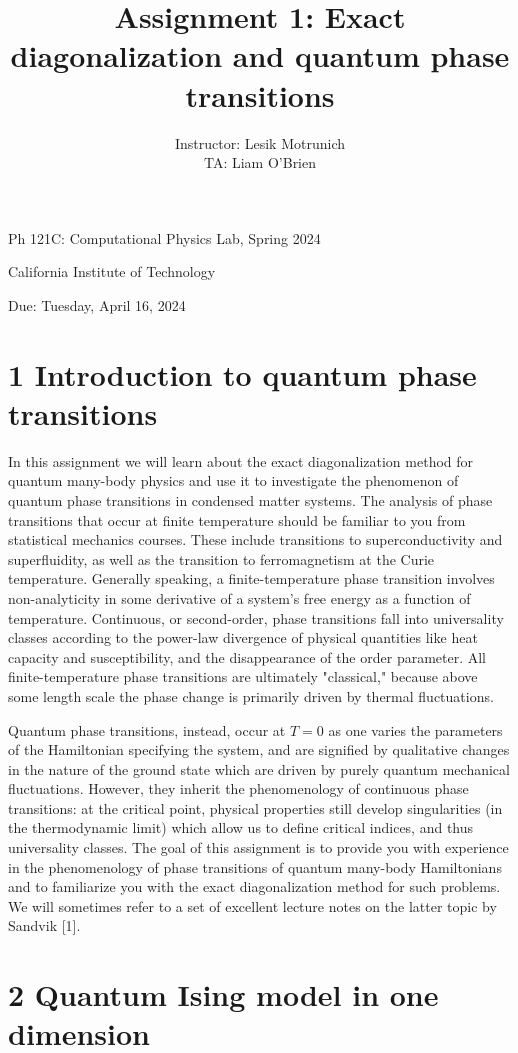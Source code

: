 \documentclass[12pt]{article}
\title{Assignment 1: Exact diagonalization and quantum phase transitions }
\author{Instructor: Lesik Motrunich\\
TA: Liam O'Brien}
\date{}
\begin{document}
\maketitle
Ph 121C: Computational Physics Lab, Spring 2024

California Institute of Technology

Due: Tuesday, April 16, 2024

\section*{1 Introduction to quantum phase transitions}
In this assignment we will learn about the exact diagonalization method for quantum many-body physics and use it to investigate the phenomenon of quantum phase transitions in condensed matter systems. The analysis of phase transitions that occur at finite temperature should be familiar to you from statistical mechanics courses. These include transitions to superconductivity and superfluidity, as well as the transition to ferromagnetism at the Curie temperature. Generally speaking, a finite-temperature phase transition involves non-analyticity in some derivative of a system's free energy as a function of temperature. Continuous, or second-order, phase transitions fall into universality classes according to the power-law divergence of physical quantities like heat capacity and susceptibility, and the disappearance of the order parameter. All finite-temperature phase transitions are ultimately "classical," because above some length scale the phase change is primarily driven by thermal fluctuations.

Quantum phase transitions, instead, occur at $T=0$ as one varies the parameters of the Hamiltonian specifying the system, and are signified by qualitative changes in the nature of the ground state which are driven by purely quantum mechanical fluctuations. However, they inherit the phenomenology of continuous phase transitions: at the critical point, physical properties still develop singularities (in the thermodynamic limit) which allow us to define critical indices, and thus universality classes. The goal of this assignment is to provide you with experience in the phenomenology of phase transitions of quantum many-body Hamiltonians and to familiarize you with the exact diagonalization method for such problems. We will sometimes refer to a set of excellent lecture notes on the latter topic by Sandvik [1].

\section*{2 Quantum Ising model in one dimension}
\end{document}
